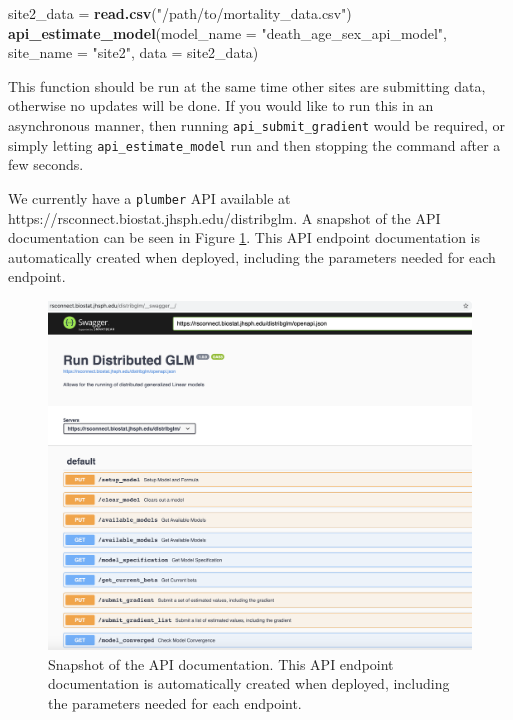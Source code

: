 \documentclass[]{elsarticle} %
\newenvironment{Shaded}{\begin{snugshade}}{\end{snugshade}}
\newcommand{\DataTypeTok}[1]{\textcolor[rgb]{0.13,0.29,0.53}{#1}}
\newcommand{\KeywordTok}[1]{\textcolor[rgb]{0.13,0.29,0.53}{\textbf{#1}}}
\newcommand{\NormalTok}[1]{#1}
\newcommand{\StringTok}[1]{\textcolor[rgb]{0.31,0.60,0.02}{#1}}
\begin{document}
\begin{Shaded}
\begin{Highlighting}[]
\NormalTok{site2\_data =}\StringTok{ }\KeywordTok{read.csv}\NormalTok{(}\StringTok{"/path/to/mortality\_data.csv"}\NormalTok{)}
\KeywordTok{api\_estimate\_model}\NormalTok{(}\DataTypeTok{model\_name =}  \StringTok{"death\_age\_sex\_api\_model"}\NormalTok{, }
                   \DataTypeTok{site\_name =} \StringTok{"site2"}\NormalTok{, }\DataTypeTok{data =}\NormalTok{ site2\_data)}
\end{Highlighting}
\end{Shaded}

This function should be run at the same time other sites are submitting data, otherwise no updates will be done. If you would like to run this in an asynchronous manner, then running \texttt{api\_submit\_gradient} would be required, or simply letting \texttt{api\_estimate\_model} run and then stopping the command after a few seconds.

We currently have a \texttt{plumber} API available at https://rsconnect.biostat.jhsph.edu/distribglm. A snapshot of the API documentation can be seen in Figure \ref{fig:docs}. This API endpoint documentation is automatically created when deployed, including the parameters needed for each endpoint.

\begin{figure}
\centering
\includegraphics{docs.png}
\caption{\label{fig:docs}Snapshot of the API documentation. This API endpoint documentation is automatically created when deployed, including the parameters needed for each endpoint.}
\end{figure}
\end{document}
